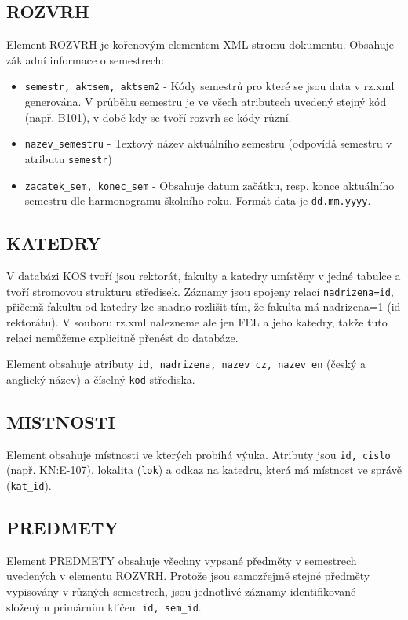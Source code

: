 \documentclass[11pt,twoside,a4paper]{book}
\begin{document}
\subsection{ROZVRH}
Element ROZVRH je kořenovým elementem XML stromu dokumentu. Obsahuje základní informace o semestrech:
\begin{itemize}
\item \texttt{semestr, aktsem, aktsem2} - Kódy semestrů pro které se jsou data v rz.xml generována. V průběhu semestru je ve všech atributech uvedený stejný kód (např. B101), v době kdy se tvoří rozvrh se kódy různí.
\item \texttt{nazev\_semestru} - Textový název aktuálního semestru (odpovídá semestru v atributu \texttt{semestr})
\item \texttt{zacatek\_sem, konec\_sem} - Obsahuje datum začátku, resp. konce aktuálního semestru dle harmonogramu školního roku. Formát data je \texttt{dd.mm.yyyy}.
\end{itemize}

\subsection{KATEDRY}
V databázi KOS tvoří jsou rektorát, fakulty a katedry umístěny v jedné tabulce a tvoří stromovou strukturu středisek. Záznamy jsou spojeny relací \texttt{nadrizena=id}, přičemž fakultu od katedry lze snadno rozlišit tím, že fakulta má nadrizena=1 (id rektorátu). V souboru rz.xml nalezneme ale jen FEL a jeho katedry, takže tuto relaci nemůžeme explicitně přenést do databáze.

Element obsahuje atributy \texttt{id, nadrizena, nazev\_cz, nazev\_en} (český a anglický název) a číselný \texttt{kod} střediska.

\subsection{MISTNOSTI}
Element obsahuje místnosti ve kterých probíhá výuka. Atributy jsou \texttt{id, cislo} (např. KN:E-107), lokalita (\texttt{lok}) a odkaz na katedru, která má místnost ve správě (\texttt{kat\_id}).

\subsection{PREDMETY}
Element PREDMETY obsahuje všechny vypsané předměty v semestrech uvedených v elementu ROZVRH. Protože jsou samozřejmě stejné předměty vypisovány v různých semestrech, jsou jednotlivé záznamy identifikované složeným primárním klíčem \texttt{id, sem\_id}.
\end{document}
